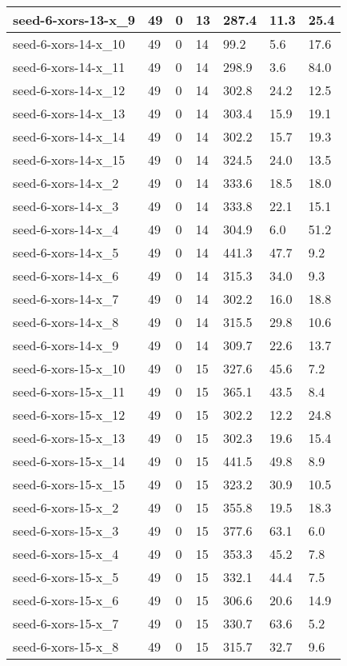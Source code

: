 \begin{scriptsize}
\begin{longtable}{|p{5cm}|l|l|l|l|l|l|}
seed-6-xors-13-x\_9&49&0&13&287.4&11.3&25.4 \\ \hline 
seed-6-xors-14-x\_10&49&0&14&99.2&5.6&17.6 \\ \hline 
seed-6-xors-14-x\_11&49&0&14&298.9&3.6&84.0 \\ \hline 
seed-6-xors-14-x\_12&49&0&14&302.8&24.2&12.5 \\ \hline 
seed-6-xors-14-x\_13&49&0&14&303.4&15.9&19.1 \\ \hline 
seed-6-xors-14-x\_14&49&0&14&302.2&15.7&19.3 \\ \hline 
seed-6-xors-14-x\_15&49&0&14&324.5&24.0&13.5 \\ \hline 
seed-6-xors-14-x\_2&49&0&14&333.6&18.5&18.0 \\ \hline 
seed-6-xors-14-x\_3&49&0&14&333.8&22.1&15.1 \\ \hline 
seed-6-xors-14-x\_4&49&0&14&304.9&6.0&51.2 \\ \hline 
seed-6-xors-14-x\_5&49&0&14&441.3&47.7&9.2 \\ \hline 
seed-6-xors-14-x\_6&49&0&14&315.3&34.0&9.3 \\ \hline 
seed-6-xors-14-x\_7&49&0&14&302.2&16.0&18.8 \\ \hline 
seed-6-xors-14-x\_8&49&0&14&315.5&29.8&10.6 \\ \hline 
seed-6-xors-14-x\_9&49&0&14&309.7&22.6&13.7 \\ \hline 
seed-6-xors-15-x\_10&49&0&15&327.6&45.6&7.2 \\ \hline 
seed-6-xors-15-x\_11&49&0&15&365.1&43.5&8.4 \\ \hline 
seed-6-xors-15-x\_12&49&0&15&302.2&12.2&24.8 \\ \hline 
seed-6-xors-15-x\_13&49&0&15&302.3&19.6&15.4 \\ \hline 
seed-6-xors-15-x\_14&49&0&15&441.5&49.8&8.9 \\ \hline 
seed-6-xors-15-x\_15&49&0&15&323.2&30.9&10.5 \\ \hline 
seed-6-xors-15-x\_2&49&0&15&355.8&19.5&18.3 \\ \hline 
seed-6-xors-15-x\_3&49&0&15&377.6&63.1&6.0 \\ \hline 
seed-6-xors-15-x\_4&49&0&15&353.3&45.2&7.8 \\ \hline 
seed-6-xors-15-x\_5&49&0&15&332.1&44.4&7.5 \\ \hline 
seed-6-xors-15-x\_6&49&0&15&306.6&20.6&14.9 \\ \hline 
seed-6-xors-15-x\_7&49&0&15&330.7&63.6&5.2 \\ \hline 
seed-6-xors-15-x\_8&49&0&15&315.7&32.7&9.6 \\ \hline 

\end{longtable}
\end{scriptsize}
